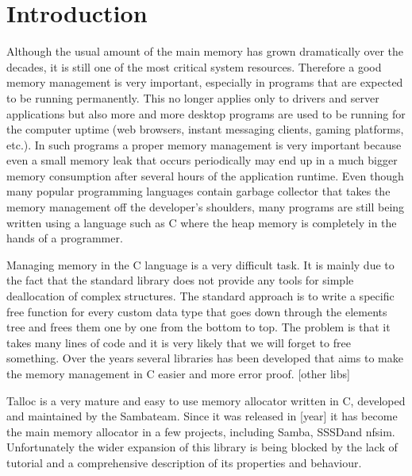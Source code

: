 \chapter{Introduction}

Although the usual amount of the main memory has grown dramatically over the
decades, it is still one of the most critical system resources. Therefore a good
memory management is very important, especially in programs that are expected to
be running permanently. This no longer applies only to drivers and server
applications but also more and more desktop programs are used to be running
for the computer uptime (web browsers, instant messaging clients, gaming
platforms, etc.). In such programs a proper memory management is very important
because even a small memory leak that occurs periodically may end up in a much
bigger memory consumption after several hours of the application runtime. Even
though many popular programming languages contain garbage collector that takes
the memory management off the developer's shoulders, many programs are still
being written using a language such as C where the heap memory is completely
in the hands of a programmer.

Managing memory in the C language is a very difficult task. It is mainly due to
the fact that the standard library does not provide any tools for simple
deallocation of complex structures. The standard approach is to write a
specific free function for every custom data type that goes down through the
elements tree and frees them one by one from the bottom to top. The problem is
that it takes many lines of code and it is very likely that we will forget to
free something. Over the years several libraries has been developed that aims
to make the memory management in C easier and more error proof. [other libs]

Talloc is a very mature and easy to use memory allocator written in C, developed
and maintained by the Samba\footnotemark[1] team. Since it was released in
[year] it has become the main memory allocator in a few projects, including Samba,
SSSD\footnotemark[2] and nfsim\footnotemark[3]. Unfortunately the wider
expansion of this library is being blocked by the lack of tutorial and a
comprehensive description of its properties and behaviour.


